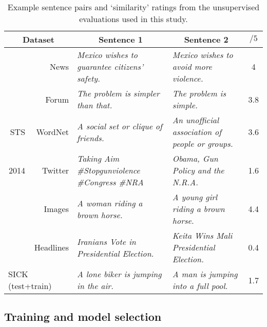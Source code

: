 \begin{table*}[ht]
\begin{adjustwidth}{-1.6cm}{}
\renewcommand{\tabcolsep}{4.6pt}
\footnotesize
\newcommand{\mc}[1]{\multicolumn{1}{l|}{#1}}
  \begin{center}

      {
        \begin{tabular}{rr|l|l|c}
          \multicolumn{2}{c|}{Dataset} & \multicolumn{1}{c}{Sentence 1} &\multicolumn{1}{|c|}{Sentence 2} & \(/5\)  \\
          \hline
          \hline
           & News & \emph{Mexico wishes to guarantee citizens' safety.} &\emph{Mexico wishes to avoid more violence.} & 4 \\
           & Forum &  \emph{The problem is simpler than that.} &  \emph{The problem is simple.}  & 3.8 \\
           STS & WordNet &  \emph{A social set or clique of friends.} &  \emph{An unofficial association of people or groups.} & 3.6 \\
           2014 & Twitter & \emph{Taking Aim  \#Stopgunviolence \#Congress \#NRA} & \emph{Obama, Gun Policy and the N.R.A.}  & 1.6 \\
            & Images & \emph{A woman riding a brown horse.} &  \emph{A young girl riding a brown horse.} & 4.4 \\
           & Headlines &  \emph{Iranians Vote in Presidential Election.} &  \emph{Keita Wins Mali Presidential Election.} & 0.4  \\
          \hline
          \multicolumn{2}{l|}{SICK (test+train)} & \emph{A lone biker is jumping in the air.} & \emph{A man is jumping into a full pool.}  & 1.7 \\
          \hline 
        \end{tabular}

    }
      \end{center}
      \end{adjustwidth}
    \caption{\label{unsex} Example sentence pairs and `similarity' ratings from the unsupervised evaluations used in this study.}

  \vspace*{-4ex}

\end{table*}

\subsection{Training and model selection}



